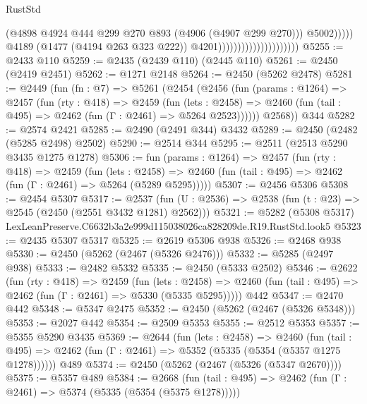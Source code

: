 \begin{lexlean}{RustStd}
\begin{coremodule}
                                                        (@4898
                                                          @4924
                                                          @444
                                                          @299
                                                          @270
                                                          @893
                                                          (@4906 (@4907 @299 @270)))
                                                        @5002)))))
                                              @4189
                                              (@1477 (@4194 @263 @323 @222))
                                              @4201)))))))))))))))))))))
@5255 := @2433 @110
@5259 := @2435 (@2439 @110) (@2445 @110)
@5261 := @2450 (@2419 @2451)
@5262 := @1271 @2148
@5264 := @2450 (@5262 @2478)
@5281 := @2449
    (fun (fn : @7) =>
    @5261
      (@2454
        (@2456
          (fun (params : @1264) =>
          @2457
            (fun (rty : @418) =>
            @2459
              (fun (lets : @2458) =>
              @2460 (fun (tail : @495) => @2462 (fun (Γ : @2461) => @5264 @2523))))))
        @2568))
    @344
@5282 := @2574 @2421
@5285 := @2490 (@2491 @344) @3432
@5289 := @2450 (@2482 (@5285 @2498) @2502)
@5290 := @2514 @344
@5295 := @2511 (@2513 @5290 @3435 @1275 @1278)
@5306 := fun (params : @1264) =>
  @2457
    (fun (rty : @418) =>
    @2459
      (fun (lets : @2458) =>
      @2460 (fun (tail : @495) => @2462 (fun (Γ : @2461) => @5264 (@5289 @5295)))))
@5307 := @2456 @5306
@5308 := @2454 @5307
@5317 := @2537 (fun (U : @2536) => @2538 (fun (t : @23) => @2545 (@2450 (@2551 @3432 @1281) @2562)))
@5321 := @5282 (@5308 @5317) LexLeanPreserve.C6632b3a2e999d115038026ca828209de.R19.RustStd.look5
@5323 := @2435 @5307 @5317
@5325 := @2619 @5306 @938
@5326 := @2468 @938
@5330 := @2450 (@5262 (@2467 (@5326 @2476)))
@5332 := @5285 (@2497 @938)
@5333 := @2482 @5332
@5335 := @2450 (@5333 @2502)
@5346 := @2622
    (fun (rty : @418) =>
    @2459
      (fun (lets : @2458) =>
      @2460 (fun (tail : @495) => @2462 (fun (Γ : @2461) => @5330 (@5335 @5295)))))
    @442
@5347 := @2470 @442
@5348 := @5347 @2475
@5352 := @2450 (@5262 (@2467 (@5326 @5348)))
@5353 := @2027 @442
@5354 := @2509 @5353
@5355 := @2512 @5353
@5357 := @5355 @5290 @3435
@5369 := @2644
    (fun (lets : @2458) =>
    @2460
      (fun (tail : @495) => @2462 (fun (Γ : @2461) => @5352 (@5335 (@5354 (@5357 @1275 @1278))))))
    @489
@5374 := @2450 (@5262 (@2467 (@5326 (@5347 @2670))))
@5375 := @5357 @489
@5384 := @2668
    (fun (tail : @495) => @2462 (fun (Γ : @2461) => @5374 (@5335 (@5354 (@5375 @1278)))))

\end{coremodule}
\end{lexlean}
